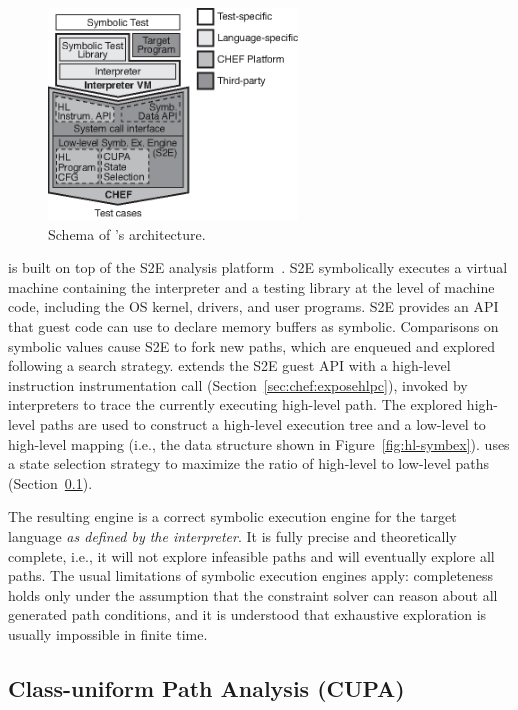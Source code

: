 \begin{figure}
  \centering
  \includegraphics[width=2.6in]{figures/chef/system-arch}
  \caption{Schema of \chef's architecture.}
  \label{fig:system-arch}
\end{figure}

\chef is built on top of the S2E analysis platform~\cite{s2eSystem}. S2E symbolically executes a virtual machine containing the interpreter and a testing library at the level of machine code,  including the OS kernel, drivers, and user programs.  S2E provides an API that guest code can use to declare memory buffers as symbolic. Comparisons on symbolic values cause S2E to fork new paths, which are enqueued and explored following a search strategy.
%
\chef extends the S2E guest API with a high-level instruction instrumentation call (Section~\ref{sec:chef:exposehlpc}), invoked by interpreters to trace the currently executing high-level path.  The explored high-level paths are used to construct a high-level execution tree and a low-level to high-level mapping (i.e., the data structure shown in Figure~\ref{fig:hl-symbex}).  \chef uses a state selection strategy to maximize the ratio of high-level to low-level paths (Section~\ref{sec:chef:cupa}).

The resulting engine is a correct symbolic execution engine for the target language \textit{as defined by the interpreter}. It is fully precise and theoretically complete, i.e., it will not explore infeasible paths and will eventually explore all paths. The usual limitations of symbolic execution engines apply: completeness holds only under the assumption that the constraint solver can reason about all generated path conditions, and it is understood that exhaustive exploration is usually impossible in finite time.

\subsection{Class-uniform Path Analysis (CUPA)}
\label{sec:chef:cupa}

